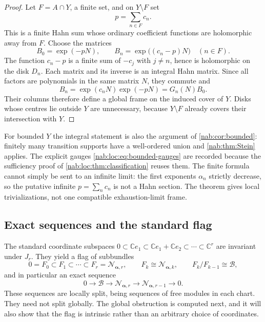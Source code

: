 \documentclass[11pt,letterpaper]{article}
\theoremstyle{definition}
\theoremstyle{remark}
\newcommand{\C}{\mathbb C}
\newcommand{\BB}{\mathscr B}
\newcommand{\profile}{\boldsymbol\alpha}
\newcommand{\NN}[1]{\mathcal N_{\profile,#1}}
\numberwithin{equation}{section}
\begin{document}
\begin{proof}
Let $F=A\cap Y$, a finite set, and on $Y\setminus F$ set
\[
 p=\sum_{n\in F}c_n.
\]
This is a finite Hahn sum whose ordinary coefficient functions are holomorphic
away from $F$. Choose the matrices
\begin{equation}\label{nab:loc:eq:bounded-gauges}
 B_0=\exp(-pN),\qquad B_n=\exp\bigl((c_n-p)N\bigr)\quad(n\in F).
\end{equation}
The function $c_n-p$ is a finite sum of $-c_j$ with $j\neq n$, hence is
holomorphic on the disk $D_n$. Each matrix and its inverse is an integral Hahn
matrix. Since all factors are polynomials in the same matrix $N$, they commute
and
\[
 B_n=\exp(c_nN)\exp(-pN)=G_n(N)B_0.
\]
Their columns therefore define a global frame on the induced cover of $Y$.
Disks whose centres lie outside $Y$ are unnecessary, because $Y\setminus F$
already covers their intersection with $Y$.
\end{proof}

For bounded $Y$ the integral statement is also the argument of
\cref{nab:cor:bounded}: finitely many transition supports have a well-ordered
union and \cref{nab:thm:Stein} applies. The explicit gauges
\eqref{nab:loc:eq:bounded-gauges} are recorded because the sufficiency proof of
\cref{nab:loc:thm:classification} reuses them. The finite formula cannot simply
be sent to an infinite limit: the first exponents $\alpha_n$ strictly decrease,
so the putative infinite $p=\sum_nc_n$ is not a Hahn section. The theorem gives
local trivializations, not one compatible exhaustion-limit frame.

\subsection{Exact sequences and the standard flag}

The standard coordinate subspaces
$0\subset\C e_1\subset\C e_1+\C e_2\subset\cdots\subset\C^r$ are invariant
under $J_r$. They yield a flag of subbundles
\begin{equation}\label{nab:loc:eq:standard-flag}
 0=F_0\subset F_1\subset\cdots\subset F_r=\NN r,
 \qquad F_k\cong\NN k,
 \qquad F_k/F_{k-1}\cong\BB,
\end{equation}
and in particular an exact sequence
\begin{equation}\label{nab:loc:eq:standard-extension}
 0\longrightarrow\BB\longrightarrow\NN r\longrightarrow\NN{r-1}
 \longrightarrow0.
\end{equation}
These sequences are locally split, being sequences of free modules in each
chart. They need not split globally. The global obstruction is computed next,
and it will also show that the flag is intrinsic rather than an arbitrary
choice of coordinates.
\end{document}
